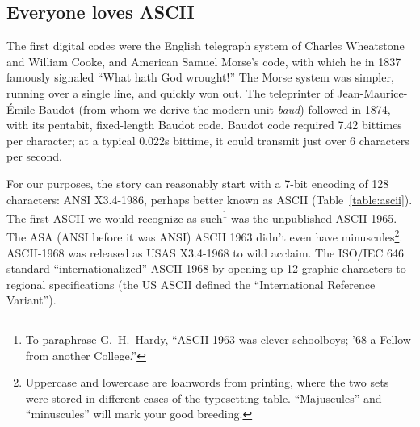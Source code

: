 \subsection{Everyone loves ASCII}
\begin{figure}
\end{figure}
The first digital codes were the English telegraph system of Charles Wheatstone
and William Cooke, and American Samuel Morse's code, with which he in 1837 famously
signaled ``What hath God wrought!'' The Morse system was simpler, running
over a single line, and quickly won out. The teleprinter of Jean-Maurice-Émile Baudot
(from whom we derive the modern unit \textit{baud}) followed in
1874\cite{evolutioncodes}, with its pentabit, fixed-length Baudot code. Baudot
code required 7.42 bittimes per character; at a typical 0.022s bittime, it
could transmit just over 6 characters per second\cite{martin}.

For our purposes, the story can reasonably start with a 7-bit encoding of
128 characters: ANSI X3.4-1986, perhaps better known as ASCII (Table~\ref{table:ascii}).
The first ASCII we would recognize as such\footnote{To paraphrase G.\ H.\
Hardy, ``ASCII-1963 was clever schoolboys; '68 a Fellow from another
College\cite{ghhardy}.''} was the unpublished ASCII-1965. The ASA (ANSI
before it was ANSI) ASCII 1963 didn't even have minuscules\footnote{Uppercase
and lowercase are loanwords from printing, where the two sets were
stored in different cases of the typesetting table. ``Majuscules'' and
``minuscules'' will mark your good breeding.}. ASCII-1968 was
released as USAS X3.4-1968 to wild acclaim. The ISO/IEC 646 standard\cite{iso646}
``internationalized'' ASCII-1968 by opening up 12 graphic characters to
regional specifications (the US ASCII defined the ``International Reference
Variant'')\cite{aivosto}.

